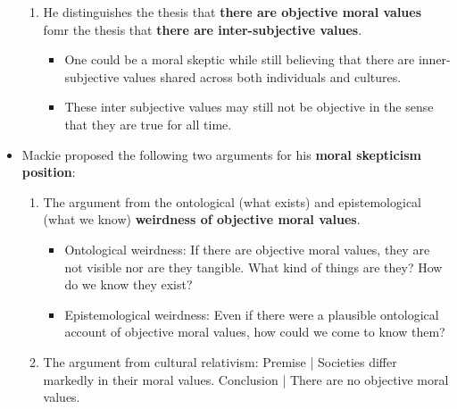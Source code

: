 \documentclass{article}
\begin{document}
\begin{itemize}
\begin{enumerate}
            \item He distinguishes the thesis that \textbf{there are objective moral values} fomr the thesis that \textbf{there are inter-subjective values}.
            \begin{itemize}
                \item One could be a moral skeptic while still believing that there are inner-subjective values shared across both individuals and cultures.
                \item These inter subjective values may still not be objective in the sense that they are true for all time.
            \end{itemize}
        \end{enumerate}
        \item Mackie proposed the following two arguments for his \textbf{moral skepticism position}:
        \begin{enumerate}
            \item The argument from the ontological (what exists) and epistemological (what we know) \textbf{weirdness of objective moral values}.
            \begin{itemize}
                \item Ontological weirdness: If there are objective moral values, they are not visible nor are they tangible. What kind of things are they? How do we know they exist?
                \item Epistemological weirdness: Even if there were a plausible ontological account of objective moral values, how could we come to know them?
            \end{itemize}
            \item The argument from cultural relativism: \newline Premise | Societies differ markedly in their moral values. \newline Conclusion | There are no objective moral values.
        \end{enumerate}
    \end{itemize}
\end{document}
